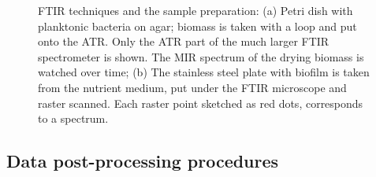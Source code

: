 \documentclass[foods,article,submit,moreauthors,pdftex]{Definitions/mdpi}
\begin{document}
\begin{figure}[ht]
  \caption{FTIR techniques and the sample preparation: (a) Petri dish with planktonic bacteria on agar; biomass is taken with a loop and put onto the ATR. Only the ATR part of the much larger FTIR spectrometer is shown.  The MIR spectrum of the drying biomass is watched over time; (b) The stainless steel plate with biofilm is taken from the nutrient medium, put under the FTIR microscope and raster scanned. Each raster point sketched as red dots, corresponds to a spectrum.}
 \label{fig:FTIRtechniques}
\end{figure}



\subsection{Data post-processing procedures}
\end{document}
